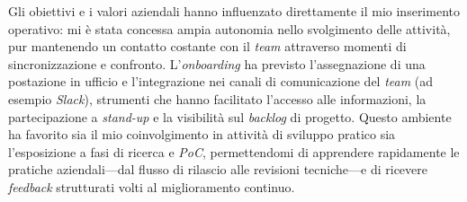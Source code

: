 Gli obiettivi e i valori aziendali hanno influenzato direttamente il mio inserimento operativo: mi è stata concessa ampia autonomia nello svolgimento delle attività,
pur mantenendo un contatto costante con il \emph{team} attraverso momenti di sincronizzazione e confronto. L'\emph{onboarding} ha previsto l'assegnazione di una postazione in ufficio e
l'integrazione nei canali di comunicazione del \emph{team} (ad esempio \emph{Slack}), strumenti che hanno facilitato l'accesso alle informazioni, la partecipazione a \emph{stand-up} e la
visibilità sul \emph{backlog} di progetto. Questo ambiente ha favorito sia il mio coinvolgimento in attività di sviluppo pratico sia l'esposizione a fasi di ricerca e \emph{PoC},
permettendomi di apprendere rapidamente le pratiche aziendali—dal flusso di rilascio alle revisioni tecniche—e di ricevere \emph{feedback} strutturati volti al miglioramento continuo.